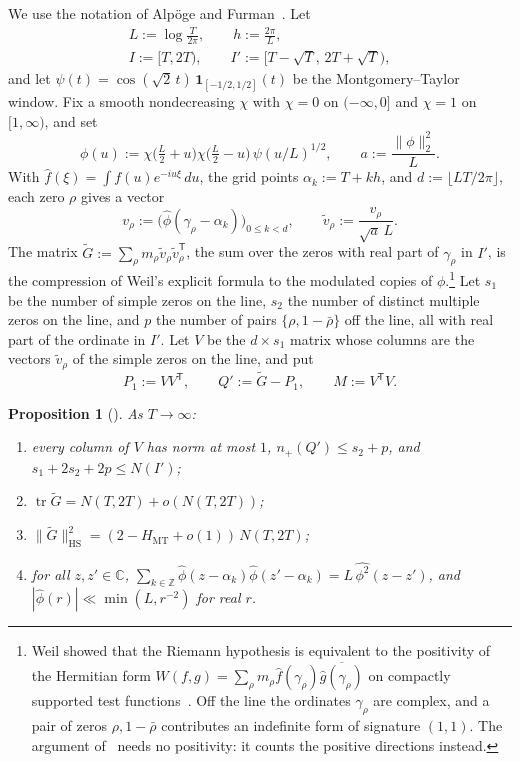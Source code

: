 \documentclass[aps,prd,twocolumn,superscriptaddress,nofootinbib,longbibliography,floatfix,showkeys,amsmath,amssymb,10pt]{revtex4-2}
\newtheorem{proposition}[theorem]{Proposition}
\theoremstyle{definition}
\theoremstyle{remark}
\newcommand{\Z}{\mathbb{Z}}
\newcommand{\C}{\mathbb{C}}
\newcommand{\HS}{\mathrm{HS}}
\newcommand{\MT}{\mathrm{MT}}
\newcommand{\Gt}{\widetilde G}
\DeclareMathOperator{\tr}{tr}
\begin{document}
We use the notation of Alp\"oge and Furman~\cite{AF26}. Let
\begin{gather*}
 L:=\log\frac T{2\pi},\qquad h:=\frac{2\pi}L,\\
 I:=[T,2T),\qquad I':=[T-\sqrt T,\,2T+\sqrt T),
\end{gather*}
and let $\psi(t)=\cos(\sqrt2\,t)\,\mathbf 1_{[-1/2,1/2]}(t)$ be the
Montgomery--Taylor window. Fix a smooth nondecreasing $\chi$ with $\chi=0$
on $(-\infty,0]$ and $\chi=1$ on $[1,\infty)$, and set
\[
 \phi(u):=\chi\bigl(\tfrac L2+u\bigr)\chi\bigl(\tfrac L2-u\bigr)\,
 \psi(u/L)^{1/2},\qquad
 a:=\frac{\|\phi\|_2^2}L.
\]
With $\widehat f(\xi)=\int f(u)e^{-iu\xi}\,du$, the grid points
$\alpha_k:=T+kh$, and $d:=\lfloor LT/2\pi\rfloor$, each zero $\rho$ gives a
vector
\[
 v_\rho:=\bigl(\widehat\phi(\gamma_\rho-\alpha_k)\bigr)_{0\le k<d},
 \qquad \tilde v_\rho:=\frac{v_\rho}{\sqrt a\,L}.
\]
The matrix $\Gt:=\sum_\rho m_\rho\tilde v_\rho\tilde v_\rho^{\mathsf T}$, the
sum over the zeros with real part of $\gamma_\rho$ in $I'$, is the
compression of Weil's explicit formula to the modulated copies
of $\phi$.\footnote{Weil showed that the Riemann hypothesis is equivalent
to the positivity of the Hermitian form
$W(f,g)=\sum_\rho m_\rho\widehat f(\gamma_\rho)\overline{\widehat
g(\gamma_\rho)}$ on compactly supported test functions~\cite{Wei52}. Off the
line the ordinates $\gamma_\rho$ are complex, and a pair of zeros
$\rho,1-\bar\rho$ contributes an indefinite form of signature $(1,1)$. The
argument of~\cite{AF26} needs no positivity: it counts the positive
directions instead.} Let $s_1$ be the number of simple zeros on the line,
$s_2$ the number of distinct multiple zeros on the line, and $p$ the number
of pairs $\{\rho,1-\bar\rho\}$ off the line, all with real part of the
ordinate in $I'$. Let $V$ be the $d\times s_1$ matrix whose columns are the
vectors $\tilde v_\rho$ of the simple zeros on the line, and put
\[
 P_1:=VV^{\mathsf T},\qquad Q':=\Gt-P_1,\qquad M:=V^{\mathsf T}V.
\]

\begin{proposition}[\cite{AF26}]\label{prop:AF}
As $T\to\infty$:
\begin{enumerate}[label=(\alph*),leftmargin=*]
\item every column of $V$ has norm at most $1$, $n_+(Q')\le s_2+p$, and
 $s_1+2s_2+2p\le N(I')$;
\item $\tr\Gt=N(T,2T)+o(N(T,2T))$;
\item $\|\Gt\|_\HS^2=(2-H_\MT+o(1))\,N(T,2T)$;
\item for all $z,z'\in\C$,
 $\sum_{k\in\Z}\widehat\phi(z-\alpha_k)\widehat\phi(z'-\alpha_k)=
 L\,\widehat{\phi^2}(z-z')$, and
 $|\widehat\phi(r)|\ll\min(L,r^{-2})$ for real $r$.
\end{enumerate}
\end{proposition}
\end{document}
